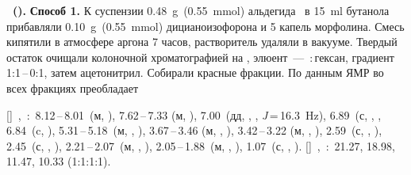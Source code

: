 \textbf{~().}
\textbf{Способ 1.} К суспензии \SI{0.48}{\gram}~(\SI{0.55}{\mmol}) альдегида~ в \SI{15}{\milli\litre} бутанола прибавляли \SI{0.10}{\gram}~(\SI{0.55}{\mmol}) дицианоизофорона и 5 капель морфолина. Смесь кипятили в атмосфере аргона 7 часов, растворитель удаляли в вакууме. Твердый остаток очищали колоночной хроматографией на , элюент~--- \,:\,гексан, градиент 1:1\,--\,0:1, затем ацетонитрил. Собирали красные фракции. По данным ЯМР во всех фракциях преобладает 
\begin{experimental}
    []~\chemdelta,~\si{\ppm}:~8.12\,--\,8.01~(м, ), 7.62\,--\,7.33 (м, ), 7.00~(дд, , , \textit{J}\,=\,16.3~\si{\hertz}), 6.89~(с, , , 6.84~(c, ), 5.31\,--\,5.18~(м, , ), 3.67\,--\,3.46 (м, , ), 3.42\,--\,3.22 (м, , ), 2.59~(с, , ), 2.45~(с, , ), 2.21\,--\,2.07~(м, , ), 2.05\,--\,1.88~(м, , ), 1.07~(с, , ).
    []~\chemdelta,~\si{\ppm}:~21.27, 18.98, 11.47, 10.33 (1:1:1:1).
\end{experimental}


